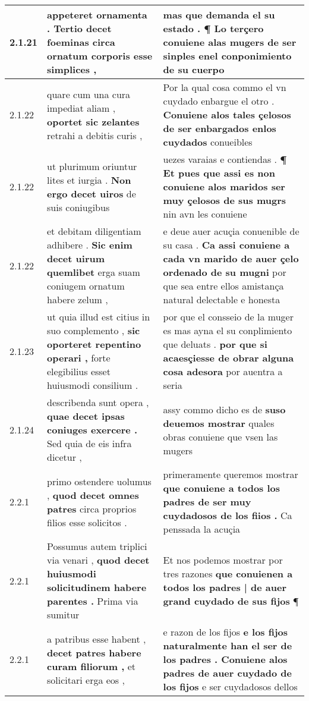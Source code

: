 \begin{tabular}{|p{1cm}|p{6.5cm}|p{6.5cm}|}
2.1.21 & appeteret ornamenta . \textbf{ Tertio decet foeminas } circa ornatum corporis esse simplices , & mas que demanda el su estado . \textbf{ ¶ Lo terçero conuiene alas mugers de ser } sinples enel conponimiento de su cuerpo \\\hline
2.1.22 & quare cum una cura impediat aliam , \textbf{ oportet sic zelantes } retrahi a debitis curis , & Por la qual cosa commo el vn cuydado enbargue el otro . \textbf{ Conuiene alos tales çelosos de ser enbargados enlos cuydados } conueibles \\\hline
2.1.22 & ut plurimum oriuntur lites et iurgia . \textbf{ Non ergo decet uiros } de suis coniugibus & uezes varaias e contiendas . \textbf{ ¶ Et pues que assi es non conuiene alos maridos ser muy çelosos de sus mugrs } nin avn les conuiene \\\hline
2.1.22 & et debitam diligentiam adhibere . \textbf{ Sic enim decet uirum quemlibet } erga suam coniugem ornatum habere zelum , & e deue auer acuçia conuenible de su casa . \textbf{ Ca assi conuiene a cada vn marido de auer çelo ordenado de su mugni } por que sea entre ellos amistança natural delectable e honesta \\\hline
2.1.23 & ut quia illud est citius in suo complemento , \textbf{ sic oporteret repentino operari , } forte elegibilius esset huiusmodi consilium . & por que el consseio de la muger es mas ayna el su conplimiento que deluats . \textbf{ por que si acaesçiesse de obrar alguna cosa adesora } por auentra a seria \\\hline
2.1.24 & describenda sunt opera , \textbf{ quae decet ipsas coniuges exercere . } Sed quia de eis infra dicetur , & assy commo dicho es de \textbf{ suso deuemos mostrar } quales obras conuiene que vsen las mugers \\\hline
2.2.1 & primo ostendere uolumus , \textbf{ quod decet omnes patres } circa proprios filios esse solicitos . & primeramente queremos mostrar \textbf{ que conuiene a todos los padres de ser muy cuydadosos de los fiios . } Ca penssada la acuçia \\\hline
2.2.1 & Possumus autem triplici via venari , \textbf{ quod decet huiusmodi solicitudinem habere parentes . } Prima via sumitur & Et nos podemos mostrar por tres razones \textbf{ que conuienen a todos los padres | de auer grand cuydado de sus fijos } ¶ \\\hline
2.2.1 & a patribus esse habent , \textbf{ decet patres habere curam filiorum , } et solicitari erga eos , & e razon de los fijos \textbf{ e los fijos naturalmente han el ser de los padres . Conuiene alos padres de auer cuydado de los fijos } e ser cuydadosos dellos \\\hline

\end{tabular}
